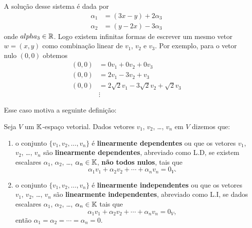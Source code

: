 A solução desse sistema é dada por
\begin{align*}
	\alpha_1 &= (3x - y) + 2\alpha_3\\
	\alpha_2 &= (y - 2x) - 3\alpha_3
\end{align*}
onde $alpha_3 \in \mathbb{R}$. Logo existem infinitas formas de escrever um mesmo vetor $w = (x, y)$ como
combinação linear de $v_1$, $v_2$ e $v_3$. Por exemplo, para o vetor nulo $(0, 0)$ obtemos
\begin{align*}
	(0, 0) &= 0v_1 + 0v_2 + 0v_3\\
	(0, 0) &= 2v_1 - 3v_2 + v_3\\
	(0, 0) &= 2\sqrt{2}v_1 - 3\sqrt{2}v_2 + \sqrt{2}v_3\\
				 &\vdots
\end{align*}

Esse caso motiva a seguinte definição:
\begin{definicao}
  Seja $V$ um $\mathbb{K}$-espaço vetorial. Dados vetores $v_1$, $v_2$, \dots, $v_n$ em $V$ dizemos que:
  \begin{enumerate}[label={\roman*})]
    \item o conjunto $\{v_1, v_2, \dots, v_n\}$ é \textbf{linearmente dependentes} ou que os vetores $v_1$, $v_2$, \dots, $v_n$ são \textbf{linearmente dependentes}, 
    	abreviado como L.D, se existem escalares
      $\alpha_1$, $\alpha_2$, \dots, $\alpha_n \in \mathbb{K}$, \textbf{não todos nulos}, tais que
      \[
        \alpha_1v_1 + \alpha_2v_2 + \cdots + \alpha_nv_n = 0_V.
      \]

    \item o conjunto $\{v_1, v_2, \dots, v_n\}$ é \textbf{linearmente independentes} ou que os vetores $v_1$, $v_2$, \dots, $v_n$ 
    	são \textbf{linearmente independentes}, abreviado como L.I, se dados escalares
      $\alpha_1$, $\alpha_2$, \dots, $\alpha_n \in \mathbb{K}$  tais que
      \[
        \alpha_1v_1 + \alpha_2v_2 + \cdots + \alpha_nv_n = 0_V,
      \]
      então $\alpha_1 = \alpha_2 = \cdots = \alpha_n = 0$.
  \end{enumerate}
\end{definicao}

